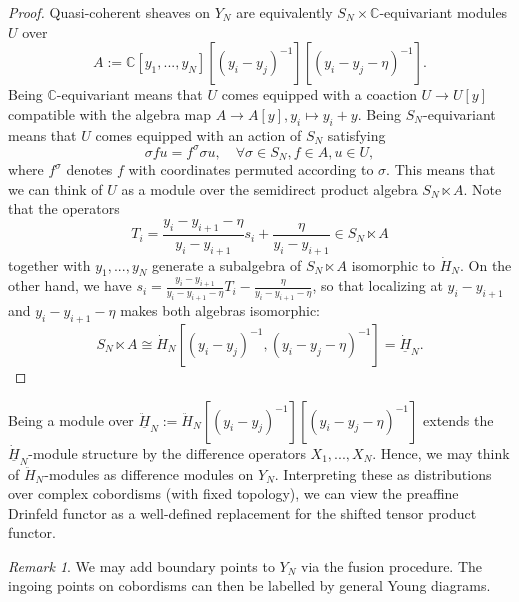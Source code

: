 \documentclass[11pt]{report}
\theoremstyle{definition}
\theoremstyle{remark}
\newtheorem*{remark}{Remark}
\theoremstyle{remark}
\newcommand{\C}{\mathbb{C}}
\begin{document}
\begin{proof}
Quasi-coherent sheaves on $Y_N$ are equivalently $S_N \times \C$-equivariant modules $U$ over
\begin{equation*}
A := \C[y_1,...,y_N][(y_i-y_j)^{-1}][(y_i-y_j-\eta)^{-1}].
\end{equation*}
Being $\C$-equivariant means that $U$ comes equipped with a coaction $U \to U[y]$ compatible with the algebra map $A \to A[y], y_i \mapsto y_i+y$. Being $S_N$-equivariant means that $U$ comes equipped with an action of $S_N$ satisfying
\begin{equation*}
\sigma f u = f^\sigma \sigma u, \quad \forall \sigma \in S_N, f \in A, u \in U,
\end{equation*}
where $f^\sigma$ denotes $f$ with coordinates permuted according to $\sigma$. This means that we can think of $U$ as a module over the semidirect product algebra $S_N \ltimes A$. Note that the operators
\begin{equation*}
T_i = \frac{y_i-y_{i+1}-\eta}{y_i-y_{i+1}} s_i + \frac{\eta}{y_i-y_{i+1}} \in S_N \ltimes A
\end{equation*}
together with $y_1,...,y_N$ generate a subalgebra of $S_N \ltimes A$ isomorphic to $\dot H_N$. On the other hand, we have $s_i = \frac{y_i-y_{i+1}}{y_i-y_{i+1}-\eta} T_i - \frac{\eta}{y_i-y_{i+1}-\eta}$, so that localizing at $y_i-y_{i+1}$ and $y_i-y_{i+1}-\eta$ makes both algebras isomorphic:
\begin{equation*}
S_N \ltimes A \cong \dot H_N[(y_i-y_j)^{-1},(y_i-y_j-\eta)^{-1}] = \underline{\dot H}_N.
\end{equation*}
\end{proof}

Being a module over $\underline{\ddot H}_N := \ddot H_N[(y_i-y_j)^{-1}][(y_i-y_j-\eta)^{-1}]$ extends the $\underline{\dot H}_N$-module structure by the difference operators $X_1,...,X_N$. Hence, we may think of $\ddot H_N$-modules as difference modules on $Y_N$. Interpreting these as distributions over complex cobordisms (with fixed topology), we can view the preaffine Drinfeld functor as a well-defined replacement for the shifted tensor product functor.

\begin{remark}
We may add boundary points to $Y_N$ via the fusion procedure. The ingoing points on cobordisms can then be labelled by general Young diagrams.
\end{remark}
\end{document}
